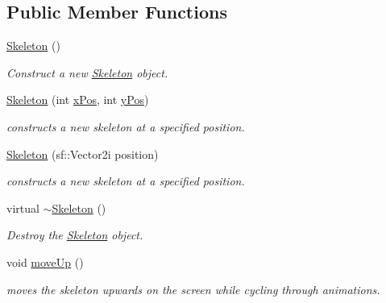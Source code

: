 \subsection*{Public Member Functions}
\begin{DoxyCompactItemize}
\item 
\mbox{\hyperlink{classSkeleton_af01a02f1ce9ae4c801cd6e66ccf7407f}{Skeleton}} ()
\begin{DoxyCompactList}\small\item\em Construct a new \mbox{\hyperlink{classSkeleton}{Skeleton}} object. \end{DoxyCompactList}\item 
\mbox{\hyperlink{classSkeleton_a71cc79a27794a470070b3d8691b8e716}{Skeleton}} (int \mbox{\hyperlink{classRose_1_1Character_1_1Actor_a0668a9c0c457d1c45e709b48111ba79d}{x\+Pos}}, int \mbox{\hyperlink{classRose_1_1Character_1_1Actor_a967b03cbbd0be4e1761cf3e99f4bb207}{y\+Pos}})
\begin{DoxyCompactList}\small\item\em constructs a new skeleton at a specified position. \end{DoxyCompactList}\item 
\mbox{\hyperlink{classSkeleton_af8700e3ac47511a9e84f913c1df78495}{Skeleton}} (sf\+::\+Vector2i position)
\begin{DoxyCompactList}\small\item\em constructs a new skeleton at a specified position. \end{DoxyCompactList}\item 
virtual \mbox{\hyperlink{classSkeleton_aeece886a4e2f039128144f94f25efd10}{$\sim$\+Skeleton}} ()
\begin{DoxyCompactList}\small\item\em Destroy the \mbox{\hyperlink{classSkeleton}{Skeleton}} object. \end{DoxyCompactList}\item 
\mbox{\label{classSkeleton_a0ddbea7574ada0b5cef0cadbd4a0dd9f}} 
void \mbox{\hyperlink{classSkeleton_a0ddbea7574ada0b5cef0cadbd4a0dd9f}{move\+Up}} ()
\begin{DoxyCompactList}\small\item\em moves the skeleton upwards on the screen while cycling through animations. \end{DoxyCompactList}\item 
\mbox{\label{classSkeleton_a3d8ce7b8a1d10e4a33a27f0eee54042e}} 

\end{DoxyCompactItemize}
